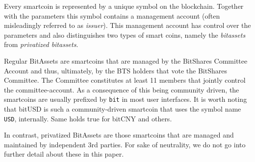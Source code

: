 Every smartcoin is represented by a unique symbol on the blockchain. Together
with the parameters this symbol contains a management account (often
misleadingly referred to as \emph{issuer}). This management account has control
over the parameters and also distinguishes two types of smart coins, namely the
\emph{bitassets} from \emph{privatized bitassets}.

Regular BitAssets are smartcoins that are managed by the BitShares Committee
Account and thus, ultimately, by the BTS holders that vote the BitShares
Committee.  The Committee constitutes at least 11 members that jointly control
the committee-account. As a consequence of this being community driven, the
smartcoins are usually prefixed by \texttt{bit} in most user interfaces. It is
worth noting that bitUSD is such a community-driven smartcoin that uses the
symbol name \texttt{USD}, internally. Same holds true for bitCNY and others.

In contrast, privatized BitAssets are those smartcoins that are managed and
maintained by independent 3rd parties. For sake of neutrality, we do not go
into further detail about these in this paper.
